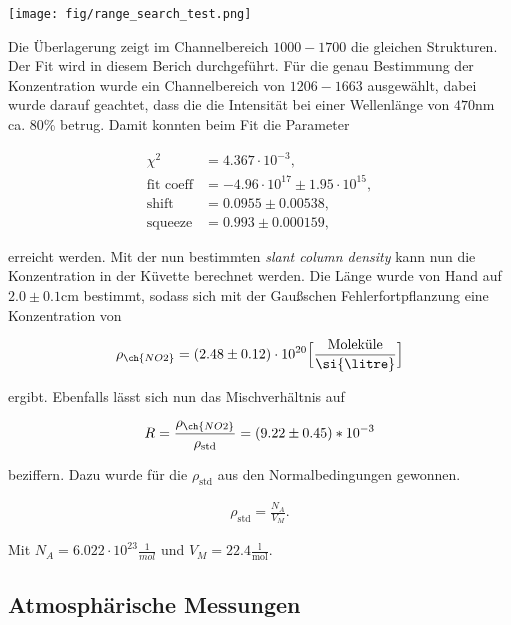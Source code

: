 \documentclass[12pt, a4paper, bibliography=totoc]{scrartcl}
\begin{document}
\begin{multicols}{2}
\begin{center}
	\texttt{[image: fig/range\_search\_test.png]}
	\label{fig:range_search}
\end{center}

Die Überlagerung zeigt im Channelbereich $1000-1700$ die gleichen Strukturen. Der Fit wird in diesem Berich durchgeführt.
Für die genau Bestimmung der  Konzentration wurde ein Channelbereich von $1206-1663$ ausgewählt, dabei wurde darauf geachtet, dass die die Intensität bei einer Wellenlänge von $470$\si{nm} ca. $80$\% betrug.
Damit konnten beim Fit die Parameter

\begin{align}
	\chi^2 &= 4.367 \cdot 10^{-3},\\
    \text{fit coeff} &= -4.96 \cdot 10^{17} \pm 1.95 \cdot 10^{15},\\
    \text{shift} &= 0.0955 \pm 0.00538,\\
    \text{squeeze} &= 0.993 \pm 0.000159, 
\end{align}

erreicht werden.
Mit der nun bestimmten \textit{slant column density} kann nun die  Konzentration in der Küvette berechnet werden.
Die Länge wurde von Hand auf $2.0 \pm 0.1$\si{cm} bestimmt, sodass sich mit der Gaußschen Fehlerfortpflanzung eine Konzentration von

\begin{align}
	\rho_{\ch{NO2}} = (2.48 \pm 0.12) \cdot 10^{20} \Bigl[ \frac{\text{Moleküle}}{\si{\litre}}\Bigr]
\end{align}

ergibt.	
Ebenfalls lässt sich nun das Mischverhältnis auf

\begin{align}
    R = \frac{\rho_{\ch{NO2}}}{\rho_{\text{std}}} = (9.22 \pm 0.45) *10^{-3}
\end{align}

beziffern. Dazu wurde für die $\rho_{\text{std}}$ aus den Normalbedingungen gewonnen.

\begin{align}
    \rho_{\text{std}} = \frac{N_A}{V_M}.
\end{align}
 	
Mit $N_A = 6.022 \cdot 10^{23} \frac{1}{\si{mol}}$ und $V_M = 22.4 \frac{\si{\litre}}{\si{\mol}}$.

\subsection{Atmosphärische Messungen}\label{ssec:atmospheric_measurements}


\end{multicols}
\end{document}
